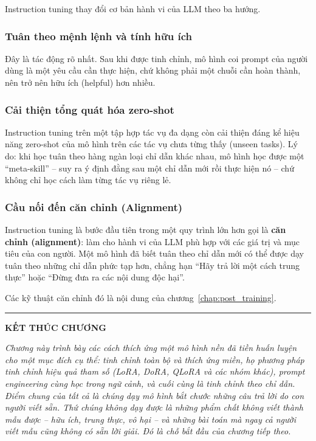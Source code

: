 Instruction tuning thay đổi cơ bản hành vi của LLM theo ba hướng.

\subsubsection{Tuân theo mệnh lệnh và tính hữu ích}
Đây là tác động rõ nhất. Sau khi được tinh chỉnh, mô hình coi prompt của người dùng là một yêu cầu cần thực hiện, chứ không phải một chuỗi cần hoàn thành, nên trở nên hữu ích (helpful) hơn nhiều.

\subsubsection{Cải thiện tổng quát hóa zero-shot}
Instruction tuning trên một tập hợp tác vụ đa dạng còn cải thiện đáng kể hiệu năng zero-shot của mô hình trên các tác vụ chưa từng thấy (unseen tasks). Lý do: khi học tuân theo hàng ngàn loại chỉ dẫn khác nhau, mô hình học được một “meta-skill” -- suy ra ý định đằng sau một chỉ dẫn mới rồi thực hiện nó -- chứ không chỉ học cách làm từng tác vụ riêng lẻ.

\subsubsection{Cầu nối đến căn chỉnh (Alignment)}
Instruction tuning là bước đầu tiên trong một quy trình lớn hơn gọi là \textbf{căn chỉnh (alignment)}: làm cho hành vi của LLM phù hợp với các giá trị và mục tiêu của con người. Một mô hình đã biết tuân theo chỉ dẫn mới có thể được dạy tuân theo những chỉ dẫn phức tạp hơn, chẳng hạn “Hãy trả lời một cách trung thực” hoặc “Đừng đưa ra các nội dung độc hại”.

Các kỹ thuật căn chỉnh đó là nội dung của chương~\ref{chap:post_training}.

\bigskip
\hrule
\bigskip

\begin{center}
	\textbf{\Large KẾT THÚC CHƯƠNG \thechapter}
\end{center}

\textit{Chương này trình bày các cách thích ứng một mô hình nền đã tiền huấn luyện cho một mục đích cụ thể: tinh chỉnh toàn bộ và thích ứng miền, họ phương pháp tinh chỉnh hiệu quả tham số (LoRA, DoRA, QLoRA và các nhóm khác), prompt engineering cùng học trong ngữ cảnh, và cuối cùng là tinh chỉnh theo chỉ dẫn. Điểm chung của tất cả là chúng dạy mô hình bắt chước những câu trả lời do con người viết sẵn. Thứ chúng không dạy được là những phẩm chất không viết thành mẫu được -- hữu ích, trung thực, vô hại -- và những bài toán mà ngay cả người viết mẫu cũng không có sẵn lời giải. Đó là chỗ bắt đầu của chương tiếp theo.}